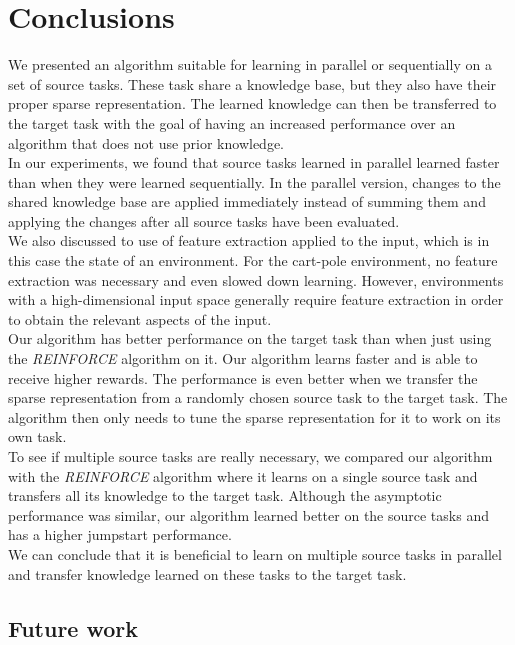 \chapter{Conclusions}

We presented an algorithm suitable for learning in parallel or sequentially on a set of source tasks.
These task share a knowledge base, but they also have their proper sparse representation.
The learned knowledge can then be transferred to the target task with the goal of having an increased performance over an algorithm that does not use prior knowledge.\\

In our experiments, we found that source tasks learned in parallel learned faster than when they were learned sequentially.
In the parallel version, changes to the shared knowledge base are applied immediately instead of summing them and applying the changes after all source tasks have been evaluated.\\

We also discussed to use of feature extraction applied to the input, which is in this case the state of an environment.
For the cart-pole environment, no feature extraction was necessary and even slowed down learning.
However, environments with a high-dimensional input space generally require feature extraction in order to obtain the relevant aspects of the input.\\

Our algorithm has better performance on the target task than when just using the \textit{REINFORCE} algorithm on it.
Our algorithm learns faster and is able to receive higher rewards.
The performance is even better when we transfer the sparse representation from a randomly chosen source task to the target task.
The algorithm then only needs to tune the sparse representation for it to work on its own task.\\

To see if multiple source tasks are really necessary, we compared our algorithm with the \textit{REINFORCE} algorithm where it learns on a single source task and transfers all its knowledge to the target task.
Although the asymptotic performance was similar, our algorithm learned better on the source tasks and has a higher jumpstart performance.\\

We can conclude that it is beneficial to learn on multiple source tasks in parallel and transfer knowledge learned on these tasks to the target task.

\section{Future work} %
\label{sec:future_work}

